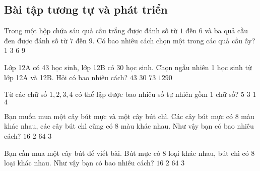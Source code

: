 \subsection{Bài tập tương tự và phát triển}
\begin{ex}%
	Trong một hộp chứa sáu quả cầu trắng được đánh số từ $1$ đến $6$ và ba quả cầu đen được đánh số từ $7$ đến $9$. Có bao nhiêu cách chọn một trong các quả cầu ấy?
	\choice
	{$1$}
	{$3$}
	{$6$}
	{\True $9$}
\end{ex}
\begin{ex}%
	Lớp 12A có 43 học sinh, lớp 12B có 30 học sinh. Chọn ngẫu nhiên 1 học sinh từ lớp 12A và 12B. Hỏi có bao nhiêu cách?
	\choice
	{\True $43$}
	{$30$}
	{$73$}
	{$1290$}
\end{ex}
\begin{ex}%
	Từ các chữ số $1, 2, 3, 4$ có thể lập được bao nhiêu số tự nhiên gồm $1$ chữ số?
	\choice
	{$5$}
	{$3$}
	{$1$}
	{\True $4$}
\end{ex}
\begin{ex}%
	Bạn muốn mua một cây bút mực và một cây bút chì. Các cây bút mực có $8$ màu khác nhau, các cây bút chì cũng có $8$ màu khác nhau. Như vậy bạn có bao nhiêu cách?
	\choice
	{$16$}
	{$2$}
	{\True $64$}
	{$3$}
\end{ex}
\begin{ex}%
	Bạn cần mua một cây bút để viết bài. Bút mực có 8 loại khác nhau, bút chì có 8 loại khác nhau. Như vậy bạn có bao nhiêu cách?
	\choice
	{\True $16$}
	{$2$}
	{$64$}
	{$3$}
\end{ex}
